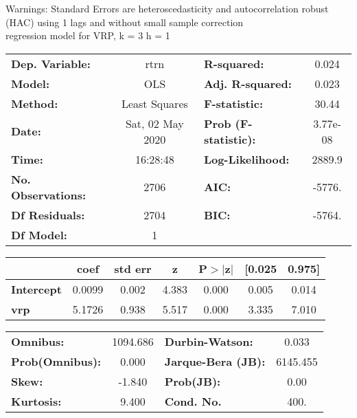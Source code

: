 Warnings: \newline
 [1] Standard Errors are heteroscedasticity and autocorrelation robust (HAC) using 1 lags and without small sample correction\\ 

regression model for VRP, k = 3 h = 1\begin{center}
\begin{tabular}{lclc}
\toprule
\textbf{Dep. Variable:}    &       rtrn       & \textbf{  R-squared:         } &     0.024   \\
\textbf{Model:}            &       OLS        & \textbf{  Adj. R-squared:    } &     0.023   \\
\textbf{Method:}           &  Least Squares   & \textbf{  F-statistic:       } &     30.44   \\
\textbf{Date:}             & Sat, 02 May 2020 & \textbf{  Prob (F-statistic):} &  3.77e-08   \\
\textbf{Time:}             &     16:28:48     & \textbf{  Log-Likelihood:    } &    2889.9   \\
\textbf{No. Observations:} &        2706      & \textbf{  AIC:               } &    -5776.   \\
\textbf{Df Residuals:}     &        2704      & \textbf{  BIC:               } &    -5764.   \\
\textbf{Df Model:}         &           1      & \textbf{                     } &             \\
\bottomrule
\end{tabular}
\begin{tabular}{lcccccc}
                   & \textbf{coef} & \textbf{std err} & \textbf{z} & \textbf{P$> |$z$|$} & \textbf{[0.025} & \textbf{0.975]}  \\
\midrule
\textbf{Intercept} &       0.0099  &        0.002     &     4.383  &         0.000        &        0.005    &        0.014     \\
\textbf{vrp}       &       5.1726  &        0.938     &     5.517  &         0.000        &        3.335    &        7.010     \\
\bottomrule
\end{tabular}
\begin{tabular}{lclc}
\textbf{Omnibus:}       & 1094.686 & \textbf{  Durbin-Watson:     } &    0.033  \\
\textbf{Prob(Omnibus):} &   0.000  & \textbf{  Jarque-Bera (JB):  } & 6145.455  \\
\textbf{Skew:}          &  -1.840  & \textbf{  Prob(JB):          } &     0.00  \\
\textbf{Kurtosis:}      &   9.400  & \textbf{  Cond. No.          } &     400.  \\
\bottomrule
\end{tabular}
\end{center}


